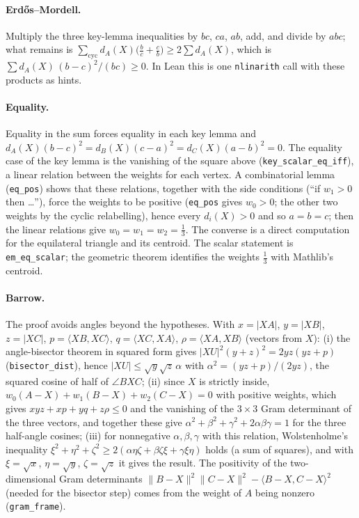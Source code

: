 \documentclass[11pt]{article}
\theoremstyle{definition}
\theoremstyle{remark}
\newcommand{\lean}[1]{\texttt{#1}}
\begin{document}
\paragraph{Erdős--Mordell.} Multiply the three key-lemma inequalities by $bc$, $ca$, $ab$, add, and
divide by $abc$; what remains is
$\sum_{\mathrm{cyc}}d_A(X)\bigl(\tfrac bc+\tfrac cb\bigr)\ge 2\sum d_A(X)$, which is
$\sum d_A(X)\,(b-c)^2/(bc)\ge0$. In Lean this is one \lean{nlinarith} call with these products as
hints.

\paragraph{Equality.} Equality in the sum forces equality in each key lemma and
$d_A(X)(b-c)^2=d_B(X)(c-a)^2=d_C(X)(a-b)^2=0$. The equality case of the key lemma is the vanishing
of the square above (\lean{key\_scalar\_eq\_iff}), a linear relation between the weights for each
vertex. A combinatorial lemma (\lean{eq\_pos}) shows that these relations, together with the side
conditions (``if $w_1>0$ then \dots''), force the weights to be positive (\lean{eq\_pos} gives $w_0>0$; the
other two weights by the cyclic relabelling), hence every $d_i(X)>0$ and so $a=b=c$; then the linear relations give $w_0=w_1=w_2=\tfrac13$. The converse is a direct
computation for the equilateral triangle and its centroid. The scalar statement is
\lean{em\_eq\_scalar}; the geometric theorem identifies the weights $\tfrac13$ with Mathlib's centroid.

\paragraph{Barrow.} The proof avoids angles beyond the hypotheses. With
$x=|XA|$, $y=|XB|$, $z=|XC|$, $p=\langle XB,XC\rangle$, $q=\langle XC,XA\rangle$,
$\rho=\langle XA,XB\rangle$ (vectors from $X$):
(i) the angle-bisector theorem in squared form gives $|XU|^2(y+z)^2=2yz(yz+p)$
(\lean{bisector\_dist}), hence $|XU|\le\sqrt y\sqrt z\,\alpha$ with $\alpha^2=(yz+p)/(2yz)$, the
squared cosine of half of $\angle BXC$; (ii) since $X$ is strictly inside,
$w_0(A-X)+w_1(B-X)+w_2(C-X)=0$ with positive weights, which gives $xyz+xp+yq+z\rho\le0$ and the
vanishing of the $3\times3$ Gram determinant of the three vectors, and together these give
$\alpha^2+\beta^2+\gamma^2+2\alpha\beta\gamma=1$ for the three half-angle cosines; (iii) for
nonnegative $\alpha,\beta,\gamma$ with this relation, Wolstenholme's inequality
$\xi^2+\eta^2+\zeta^2\ge2(\alpha\eta\zeta+\beta\zeta\xi+\gamma\xi\eta)$ holds (a sum of squares), and with $\xi=\sqrt x$,
$\eta=\sqrt y$, $\zeta=\sqrt z$ it gives the result. The positivity of the two-dimensional Gram determinants
$\|B-X\|^2\|C-X\|^2-\langle B-X,C-X\rangle^2$ (needed for the bisector step) comes from the weight of
$A$ being nonzero (\lean{gram\_frame}).
\end{document}
